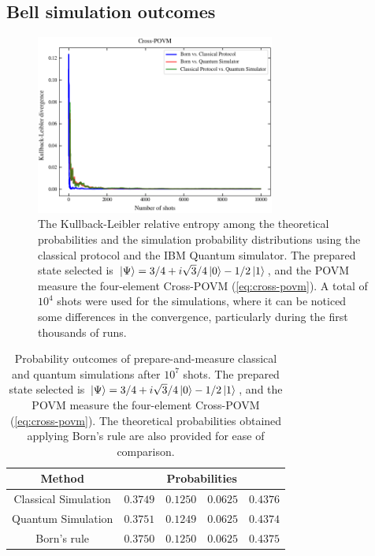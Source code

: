 \subsection{Bell simulation outcomes}

\begin{figure}[h!]
\centering
\includegraphics[width=0.7\textwidth]{images/pm_povm_kl_bcq.png}
\caption{The Kullback-Leibler relative entropy among the theoretical probabilities and the simulation probability distributions using the classical protocol and the IBM Quantum simulator. The prepared state selected is $\ket{\Psi}=3/4 + i \sqrt{3}/4 \ket{0} - 1/2 \ket{1}$, and the POVM measure the four-element Cross-POVM (\ref{eq:cross-povm}). A total of $10^4$ shots were used for the simulations, where it can be noticed some differences in the convergence, particularly during the first thousands of runs.}
\label{fig:classical_quantum_results_kl}
\end{figure}

\begin{table}[h!]
\centering
{\renewcommand{\arraystretch}{1.2}%
\begin{tabular}{c c c c c} 
 \toprule
 Method & \multicolumn{4}{c}{Probabilities}  \\ \hline
 Classical Simulation   & $\scriptstyle0.3749$ 
                        & $\scriptstyle0.1250$ 
                        & $\scriptstyle0.0625$ 
                        & $\scriptstyle0.4376$ \\ 
 Quantum Simulation     & $\scriptstyle0.3751$ 
                        & $\scriptstyle0.1249$ 
                        & $\scriptstyle0.0625$ 
                        & $\scriptstyle0.4374$ \\ 
 Born's rule            & $\scriptstyle0.3750$ 
                        & $\scriptstyle0.1250$ 
                        & $\scriptstyle0.0625$ 
                        & $\scriptstyle0.4375$ \\ 
 \bottomrule
\end{tabular}}
\caption{Probability outcomes of prepare-and-measure classical and quantum simulations after $10^{7}$ shots. The prepared state selected is $\ket{\Psi}=3/4 + i \sqrt{3}/4 \ket{0} - 1/2 \ket{1}$, and the POVM measure the four-element Cross-POVM (\ref{eq:cross-povm}). The theoretical probabilities obtained applying Born’s rule are also
provided for ease of comparison.}
\label{table:classical_quantum_results}
\end{table}

